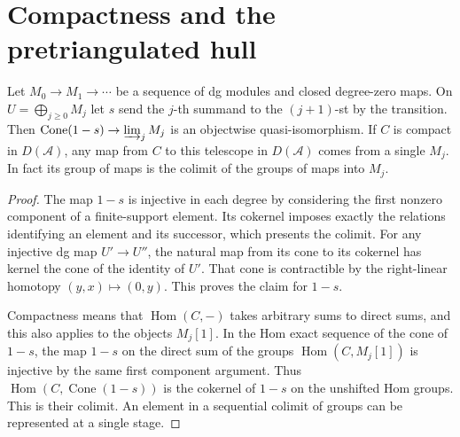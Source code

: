 \section{Compactness and the pretriangulated hull}

\begin{lemma}\label{res:G09}
Let \(M_0\to M_1\to\cdots\) be a sequence of dg modules and closed
degree-zero maps. On \(U=\bigoplus_{j\geq0}M_j\) let \(s\) send
the \(j\)-th summand to the \((j+1)\)-st by the transition.
Then \(\operatorname{Cone}(1-s)\to\varinjlim_j M_j\) is an
objectwise quasi-isomorphism. If \(C\) is compact in
\(D(\mathcal A)\), any map from \(C\) to this telescope in
\(D(\mathcal A)\) comes from a single \(M_j\). In fact its group
of maps is the colimit of the groups of maps into \(M_j\).
\end{lemma}
\begin{proof}
The map \(1-s\) is injective in each degree by considering the
first nonzero component of a finite-support element. Its cokernel
imposes exactly the relations identifying an element and its
successor, which presents the colimit. For any injective dg map
\(U'\to U''\), the natural map from its cone to its cokernel
has kernel the cone of the identity of \(U'\). That cone is
contractible by the right-linear homotopy
\((y,x)\mapsto(0,y)\). This proves the claim for \(1-s\).

Compactness means that \(\operatorname{Hom}(C,-)\) takes arbitrary
sums to direct sums, and this also applies to the objects \(M_j[1]\).
In the Hom exact sequence of the cone of \(1-s\), the map
\(1-s\) on the direct sum of the groups
\(\operatorname{Hom}(C,M_j[1])\) is injective by the same first
component argument. Thus \(\operatorname{Hom}(C,\operatorname{Cone}(1-s))\)
is the cokernel of \(1-s\) on the unshifted Hom groups. This is
their colimit. An element in a sequential colimit of groups
can be represented at a single stage.
\end{proof}

